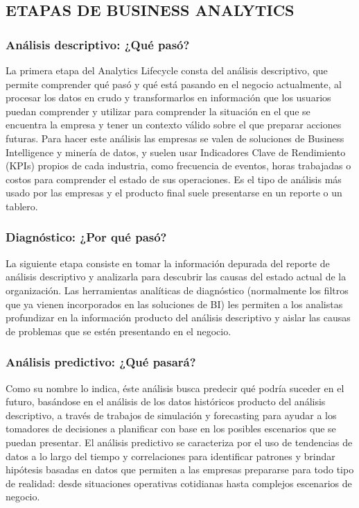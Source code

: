 \documentclass[twoside,twocolumn]{article}
\begin{document}
\subsection{ETAPAS DE BUSINESS ANALYTICS}
\subsubsection{Análisis descriptivo: ¿Qué pasó?}
La primera etapa del Analytics Lifecycle consta del análisis descriptivo, que permite comprender qué pasó y qué está pasando en el negocio actualmente, al procesar los datos en crudo y transformarlos en información que los usuarios puedan comprender y utilizar para comprender la situación en el que se encuentra la empresa y tener un contexto válido sobre el que preparar acciones futuras. Para hacer este análisis las empresas se valen de soluciones de Business Intelligence y minería de datos, y suelen usar Indicadores Clave de Rendimiento (KPIs) propios de cada industria, como frecuencia de eventos, horas trabajadas o costos para comprender el estado de sus operaciones. Es el tipo de análisis más usado por las empresas y el producto final suele presentarse en un reporte o un tablero.

\subsubsection{Diagnóstico: ¿Por qué pasó?}
La siguiente etapa consiste en tomar la información depurada del reporte de análisis descriptivo y analizarla para descubrir las causas del estado actual de la organización. Las herramientas analíticas de diagnóstico (normalmente los filtros que ya vienen incorporados en las soluciones de BI) les permiten a los analistas profundizar en la información producto del análisis descriptivo y aislar las causas de problemas que se estén presentando en el negocio.

\subsubsection{Análisis predictivo: ¿Qué pasará?}
Como su nombre lo indica, éste análisis busca predecir qué podría suceder en el futuro, basándose en el análisis de los datos históricos producto del análisis descriptivo, a través de trabajos de simulación y forecasting para ayudar a los tomadores de decisiones a planificar con base en los posibles escenarios que se puedan presentar. El análisis predictivo se caracteriza por el uso de tendencias de datos a lo largo del tiempo y correlaciones para identificar patrones y brindar hipótesis basadas en datos que permiten a las empresas prepararse para todo tipo de realidad: desde situaciones operativas cotidianas hasta complejos escenarios de negocio.
\end{document}
